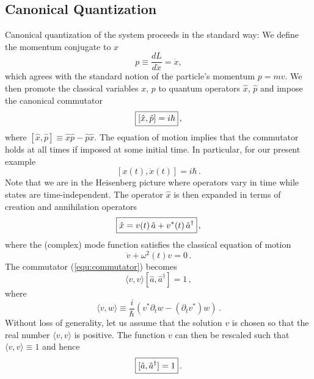 \documentclass[12pt,letterpaper,rotate]{article}
\begin{document}
{\subsection{Canonical Quantization} 
Canonical quantization of the system proceeds in the standard way:
We define the momentum conjugate to $x$
\begin{equation}
p \equiv \frac{d L}{d \dot{x}} = \dot{x},
\end{equation}
which agrees with the standard notion of the particle's momentum $p=mv$.
We then promote the classical variables $x$, $p$ to quantum operators $\hat{x}$, $\hat{p}$ and impose the canonical commutator
\begin{equation}
\label{equ:commutator}
\fbox{$\displaystyle
\left[\hat{x}, \hat{p} \right] = i \hbar $}\, ,
\end{equation}
where $[\hat x, \hat p] \equiv \hat x \hat p - \hat p \hat x$.
The equation of motion implies that the commutator holds at all times if imposed at some initial time. In particular, for our present example
\begin{equation}
\left[x(t), \dot{x}(t) \right] = i \hbar\, .
\end{equation}
Note that we are in the Heisenberg picture where operators vary in time while states are time-independent.
The operator $\hat x$ is then expanded in terms of creation and annihilation operators
\begin{equation}
\fbox{$\displaystyle
\hat{x} = v(t) \, \hat{a} + v^*(t) \, \hat{a}^\dagger $}\, ,
\end{equation}
where the (complex) mode function satisfies the classical equation of motion
\begin{equation}
\label{equ:veqn}
\ddot{v}+\omega^2(t) v =0\, .
\end{equation}
The commutator (\ref{equ:commutator}) becomes
\begin{equation}
\langle v,v \rangle [\hat{a}, \hat{a}^\dagger ]= 1\, ,
\end{equation}
where 
\begin{equation}
\langle v,w \rangle \equiv \frac{i}{\hbar} \left(v^* \partial_t w - (\partial_t v^*) w \right)\, .
\end{equation}
Without loss of generality, let us assume that the solution $v$ is chosen so that the real number $\langle v,v \rangle$ is positive. The function $v$ can then be rescaled such that $\langle v,v \rangle \equiv 1$ and hence
\begin{equation}
\label{equ:aa}
\fbox{$\displaystyle [\hat{a}, \hat{a}^\dagger ]=1$}\, .

\end{equation}}
\end{document}
